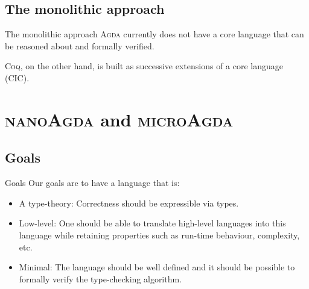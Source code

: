 \documentclass[xcolor=svgnames,11pt]{beamer}
\newcommand{\coq}{\textsc{Coq}\xspace}
\newcommand{\agda}{\textsc{Agda}\xspace}
\newcommand{\ma}{\textsc{microAgda}\xspace}
\newcommand{\na}{\textsc{nanoAgda}\xspace}
\begin{document}
\subsection{The monolithic approach}
\begin{frame}{The monolithic approach}
  \agda currently does not have a core language that can be reasoned about and formally verified.

  \coq, on the other hand, is built as successive extensions of a core language (CIC).
  \begin{figure}[htbp]
    \centering
  \end{figure}
\end{frame}

\section{\na and \ma}

\subsection{Goals}
\begin{frame}{Goals}
  Our goals are to have a language that is:
  \begin{itemize}
  \item<1-> A type-theory: Correctness should be expressible via types.
  \item<2-> Low-level: One should be able to translate high-level languages into this language while retaining properties such as run-time behaviour, complexity, etc.
  \item<3-> Minimal: The language should be well defined and it should be possible to formally verify the type-checking algorithm.
  \end{itemize}
\end{frame}
\end{document}
